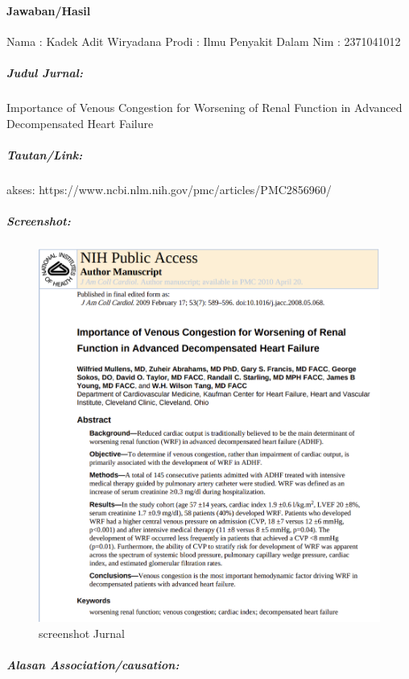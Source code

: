 \documentclass[
  letterpaper,
  DIV=11,
  numbers=noendperiod]{scrreprt}
\let\oldparagraph\paragraph
\renewcommand{\paragraph}[1]{\oldparagraph{#1}\mbox{}}
\let\oldsubparagraph\subparagraph
\renewcommand{\subparagraph}[1]{\oldsubparagraph{#1}\mbox{}}
\begin{document}
\paragraph{Jawaban/Hasil}\label{jawabanhasil}

Nama : Kadek Adit Wiryadana Prodi : Ilmu Penyakit Dalam Nim : 2371041012

\subparagraph{Judul Jurnal:}\label{judul-jurnal}

Importance of Venous Congestion for Worsening of Renal Function in
Advanced Decompensated Heart Failure

\subparagraph{Tautan/Link:}\label{tautanlink}

akses: https://www.ncbi.nlm.nih.gov/pmc/articles/PMC2856960/

\subparagraph{Screenshot:}\label{screenshot}

\begin{figure}[H]

{\centering \includegraphics{ss_jurnal_metpen1.png}

}

\caption{screenshot Jurnal}

\end{figure}%

\subparagraph{Alasan
Association/causation:}\label{alasan-associationcausation}
\end{document}
